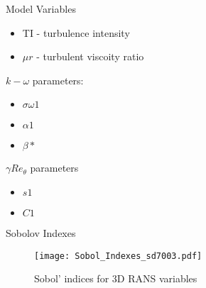 \begin{frame}{Model Variables}
\begin{itemize}
    \item    TI - turbulence intensity
    \item $\mu r$ - turbulent viscoity ratio
\end{itemize}

$k-\omega$ parameters:
\begin{itemize}
    \item $\sigma \omega 1$
    \item $\alpha 1$ 
    \item $\beta *$  
\end{itemize}
$\gamma Re_\theta$ parameters
\begin{itemize}
\item $s1 $
\item $C1$
\end{itemize}
\end{frame}


\begin{frame}{Sobolov Indexes}
    \begin{figure}
        \centering
        \texttt{[image: Sobol\_Indexes\_sd7003.pdf]}
        \caption{Sobol' indices for 3D RANS variables}
\end{figure} 
\end{frame}